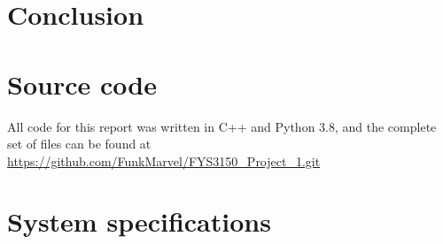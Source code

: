 \documentclass[english,notitlepage,reprint,nofootinbib]{revtex4-1}  %
\begin{document}
\section{Conclusion} \label{sec:V}

{}

\appendix
\section{Source code} \label{A}
All code for this report was written in C++ and Python 3.8, and the complete set of files can be found at \url{https://github.com/FunkMarvel/FYS3150_Project_1.git}

\section{System specifications} \label{B}
\end{document}
